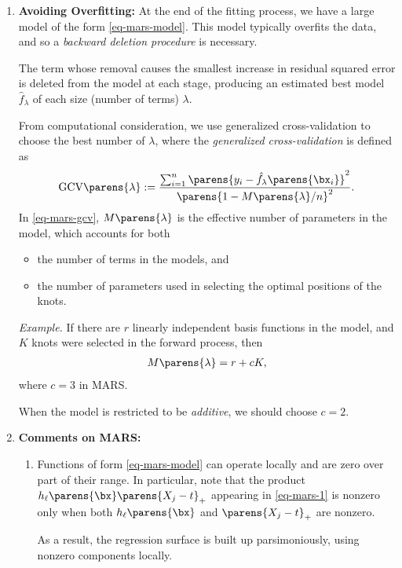 \documentclass[12pt]{article}
\begin{document}
\begin{enumerate}[label=\textbf{\arabic*.}]
	\item \textbf{Avoiding Overfitting:} At the end of the fitting process, we have a large model of the form \eqref{eq-mars-model}. This model typically overfits the data, and so a \emph{backward deletion procedure} is necessary. 
	
	The term whose removal causes the smallest increase in residual squared error is deleted from the model at each stage, producing an estimated best model $\hat{f}_{\lambda}$ of each size (number of terms) $\lambda$. 
	
	From computational consideration, we use generalized cross-validation to choose the best number of $\lambda$, where the \emph{generalized cross-validation} is defined as 
	\begin{align}\label{eq-mars-gcv}
		\mathrm{GCV} \parens{\lambda} := \frac{\sum_{i=1}^n \parens{y_i - \hat{f}_{\lambda} \parens{\bx_i}}^2}{\parens{1 - M \parens{\lambda} / n}^2}. 
	\end{align}
	In \eqref{eq-mars-gcv}, $M \parens{\lambda}$ is the effective number of parameters in the model, which accounts for both 
	\begin{itemize}
		\item the number of terms in the models, and 
		\item the number of parameters used in selecting the optimal positions of the knots. 
	\end{itemize}
	
	\textit{Example.} If there are $r$ linearly independent basis functions in the model, and $K$ knots were selected in the forward process, then 
	\begin{align*}
		M \parens{\lambda} = r + c K, 
	\end{align*}
	where $c = 3$ in MARS. 
	
	When the model is restricted to be \emph{additive}, we should choose $c = 2$. 
	
	\item \textbf{Comments on MARS:} 
	\begin{enumerate}
		\item Functions of form \eqref{eq-mars-model} can operate locally and are zero over part of their range. In particular, note that the product $h_{\ell} \parens{\bx} \parens{X_j - t}_+$ appearing in \eqref{eq-mars-1} is nonzero only when both $h_{\ell} \parens{\bx}$ and $\parens{X_j - t}_+$ are nonzero. 
		
		As a result, the regression surface is built up parsimoniously, using nonzero components locally. 


\end{enumerate}
\end{enumerate}
\end{document}
